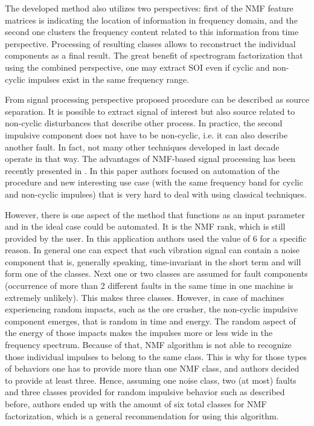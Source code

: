 \documentclass[3p,times]{elsarticle}
\begin{document}
The developed method also utilizes two perspectives: first of the NMF feature matrices is indicating the location of information in frequency domain, and the second one clusters the frequency content related to this information from time perspective. Processing of resulting classes allows to reconstruct the individual components as a final result. The great benefit of spectrogram factorization that using the combined perspective, one may extract SOI even if cyclic and non-cyclic impulses exist in the same frequency range.

From signal processing perspective proposed procedure can be described as source separation. It is possible to extract signal of interest but also source related to non-cyclic disturbances that describe other process. In practice, the second impulsive component does not have to be non-cyclic, i.e. it can also describe another fault. In fact, not many other techniques developed in last decade operate in that way. The advantages of NMF-based signal processing has been recently presented in \cite{wodecki2019impulsive}. In this paper authors focused on automation of the procedure and new interesting use case (with the same frequency band for cyclic and non-cyclic impulses) that is very hard to deal with using classical techniques.

However, there is one aspect of the method that functions as an input parameter and in the ideal case could be automated. It is the NMF rank, which is still provided by the user. In this application authors used the value of 6 for a specific reason. In general one can expect that such vibration signal can contain a noise component that is, generally speaking, time-invariant in the short term and will form one of the classes. Next one or two classes are assumed for fault components (occurrence of more than 2 different faults in the same time in one machine is extremely unlikely). This makes three classes. However, in case of machines experiencing random impacts, such as the ore crusher, the non-cyclic impulsive component emerges, that is random in time and energy. The random aspect of the energy of those impacts makes the impulses more or less wide in the frequency spectrum. Because of that, NMF algorithm is not able to recognize those individual impulses to belong to the same class. This is why for those types of behaviors one has to provide more than one NMF class, and authors decided to provide at least three. Hence, assuming one noise class, two (at most) faults and three classes provided for random impulsive behavior such as described before, authors ended up with the amount of six total classes for NMF factorization, which is a general recommendation for using this algorithm. 
\end{document}
